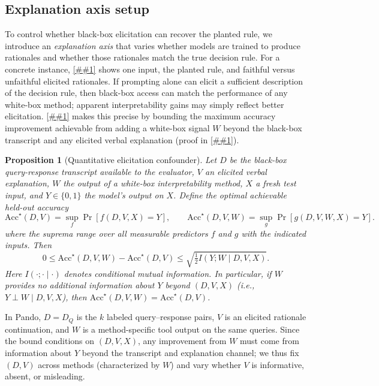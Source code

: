 \documentclass{article} %
\newtheorem{proposition}{Proposition}
\newcommand{\Cref}[1]{\ref{##1}}
\newcommand{\bench}{Pando}
\begin{document}
\subsection{Explanation axis setup}
\label{sec:explanation_setups}

To control whether black-box elicitation can recover the planted rule, we introduce an \emph{explanation axis} that varies whether models are trained to produce rationales and whether those rationales match the true decision rule.
For a concrete instance, \Cref{fig:running_example} shows one input, the planted rule, and faithful versus unfaithful elicited rationales.
If prompting alone can elicit a sufficient description of the decision rule, then black-box access can match the performance of any white-box method; apparent interpretability gains may simply reflect better elicitation.
\Cref{prop:elicitation_conf} makes this precise by bounding the maximum accuracy improvement achievable from adding a white-box signal $W$ beyond the black-box transcript and any elicited verbal explanation (proof in \Cref{app:elicitation_conf_proof}).

{\small
\begin{proposition}[Quantitative elicitation confounder]
\label{prop:elicitation_conf}
Let $D$ be the black-box query-response transcript available to the evaluator, $V$ an elicited verbal explanation, $W$ the output of a white-box interpretability method, $X$ a fresh test input, and $Y\in\{0,1\}$ the model's output on $X$.
Define the optimal achievable held-out accuracy
\[
\mathrm{Acc}^\star(D,V)=\sup_f \Pr[f(D,V,X)=Y],
\qquad
\mathrm{Acc}^\star(D,V,W)=\sup_g \Pr[g(D,V,W,X)=Y].
\]
where the suprema range over all measurable predictors $f$ and $g$ with the indicated inputs.
Then
\[
0
\le \mathrm{Acc}^\star(D,V,W)-\mathrm{Acc}^\star(D,V)
\le \sqrt{\tfrac12 I(Y;W\mid D,V,X)}.
\]
Here $I(\cdot;\cdot\mid\cdot)$ denotes conditional mutual information.
In particular, if $W$ provides no additional information about $Y$ beyond $(D,V,X)$ (i.e., $Y \perp W \mid D,V,X$), then $\mathrm{Acc}^\star(D,V,W)=\mathrm{Acc}^\star(D,V)$.
\end{proposition}
}

In \bench{}, $D=D_Q$ is the $k$ labeled query--response pairs, $V$ is an elicited rationale continuation, and $W$ is a method-specific tool output on the same queries.
Since the bound conditions on $(D,V,X)$, any improvement from $W$ must come from information about $Y$ beyond the transcript and explanation channel; we thus fix $(D,V)$ across methods (characterized by $W$) and vary whether $V$ is informative, absent, or misleading.
\end{document}
